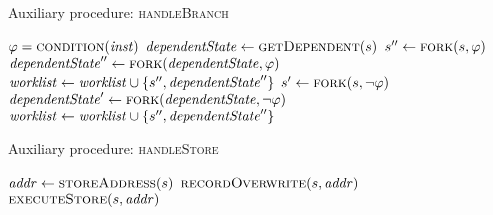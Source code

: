 \begin{algorithm}
  \caption{Auxiliary procedure: \textsc{handleBranch}
  \label{fig:aux-func-recS}}
\begin{algorithmic}[1]

 \label{alg:branch-check-recovery}
  \State $\varphi = \Call{condition}{\inst}$  \label{alg:branch-get-cond}
  \State $\dependentState \gets  \Call{getDependent}{\workstate}$ \label{alg:extract-dependent}
  \State $\workstate'' \gets \Call{fork}{\workstate,\varphi }$ \label{alg:branch-fork-true1}
  \State $\dependentState'' \gets \Call{fork}{\dependentState,\varphi }$ \label{alg:branch-fork-true2}
   \label{alg:branch-feasible-true}
    \State $\mathit{worklist}  \gets  \mathit{worklist}  \cup \{s'', \mathit{dependentState}''\}$ \label{alg:push-worklist-true-branch}
  \EndIf
  \State $\workstate' \gets \Call{fork}{\workstate, \neg\varphi}$ \label{alg:branch-fork-false1}
  \State $\dependentState' \gets \Call{fork}{\dependentState, \neg\varphi}$ \label{alg:branch-fork-false2}
    \label{alg:branch-feasible-false}
    \State $\mathit{worklist}  \gets  \mathit{worklist}  \cup \{s'', \mathit{dependentState}''\}$ \label{alg:push-worklist-false-branch}
  \EndIf
\Else
  \State {}  \label{alg:branch-normal}
\EndIf
\EndFunction
\end{algorithmic}
\end{algorithm}

\begin{algorithm}
  \caption{Auxiliary procedure: \textsc{handleStore}
  \label{fig:aux-func-recS}}
\begin{algorithmic}[1]

\State $\addr \gets \Call{storeAddress}{\workstate}$
\State $\Call{recordOverwrite}{\workstate,\addr}$     \label{alg:record-overwrite}
\State $\Call{executeStore}{\workstate,\addr}$     \label{alg:store-normal}
 \label{alg:store-check-recovery}
  \State {} \label{alg:store-udpate-dep-states}
\EndIf
\EndFunction
\end{algorithmic}
\end{algorithm}

